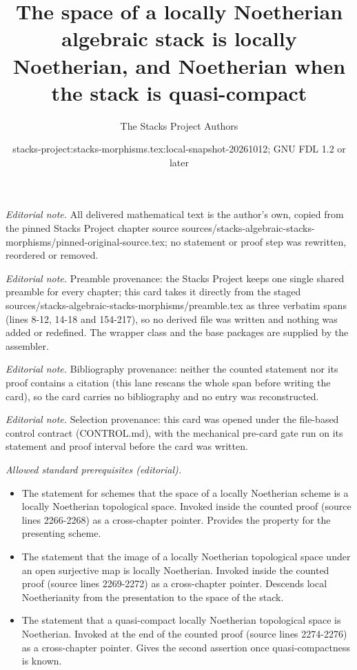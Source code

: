 \documentclass[10pt,a4paper]{amsart}
\title{The space of a locally Noetherian algebraic stack is locally Noetherian, and Noetherian when the stack is quasi-compact}
\author{The Stacks Project Authors}
\date{stacks-project:stacks-morphisms.tex:local-snapshot-20261012; GNU FDL 1.2 or later}
\theoremstyle{plain}
\theoremstyle{definition}
\theoremstyle{remark}
\numberwithin{equation}{subsection}
\begin{document}
\maketitle
\noindent\textit{Editorial note.} All delivered mathematical text is the author's own, copied from the pinned Stacks Project chapter source sources/stacks-algebraic-stacks-morphisms/pinned-original-source.tex; no statement or proof step was rewritten, reordered or removed.\par\medskip
\noindent\textit{Editorial note.} Preamble provenance: the Stacks Project keeps one single shared preamble for every chapter; this card takes it directly from the staged sources/stacks-algebraic-stacks-morphisms/preamble.tex as three verbatim spans (lines 8-12, 14-18 and 154-217), so no derived file was written and nothing was added or redefined. The wrapper class and the base packages are supplied by the assembler.\par\medskip
\noindent\textit{Editorial note.} Bibliography provenance: neither the counted statement nor its proof contains a citation (this lane rescans the whole span before writing the card), so the card carries no bibliography and no entry was reconstructed.\par\medskip
\noindent\textit{Editorial note.} Selection provenance: this card was opened under the file-based control contract (CONTROL.md), with the mechanical pre-card gate run on its statement and proof interval before the card was written.\par\medskip
\noindent\textit{Allowed standard prerequisites (editorial).}\begin{itemize}
\item The statement for schemes that the space of a locally Noetherian scheme is a locally Noetherian topological space. Invoked inside the counted proof (source lines 2266-2268) as a cross-chapter pointer. Provides the property for the presenting scheme.
\item The statement that the image of a locally Noetherian topological space under an open surjective map is locally Noetherian. Invoked inside the counted proof (source lines 2269-2272) as a cross-chapter pointer. Descends local Noetherianity from the presentation to the space of the stack.
\item The statement that a quasi-compact locally Noetherian topological space is Noetherian. Invoked at the end of the counted proof (source lines 2274-2276) as a cross-chapter pointer. Gives the second assertion once quasi-compactness is known.
\end{itemize}\medskip
\end{document}
